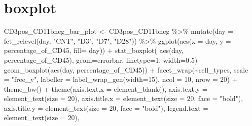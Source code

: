 \documentclass[
]{book}
\newenvironment{Shaded}{\begin{snugshade}}{\end{snugshade}}
\newcommand{\AttributeTok}[1]{\textcolor[rgb]{0.77,0.63,0.00}{#1}}
\newcommand{\DecValTok}[1]{\textcolor[rgb]{0.00,0.00,0.81}{#1}}
\newcommand{\FloatTok}[1]{\textcolor[rgb]{0.00,0.00,0.81}{#1}}
\newcommand{\FunctionTok}[1]{\textcolor[rgb]{0.00,0.00,0.00}{#1}}
\newcommand{\NormalTok}[1]{#1}
\newcommand{\OtherTok}[1]{\textcolor[rgb]{0.56,0.35,0.01}{#1}}
\newcommand{\SpecialCharTok}[1]{\textcolor[rgb]{0.00,0.00,0.00}{#1}}
\newcommand{\StringTok}[1]{\textcolor[rgb]{0.31,0.60,0.02}{#1}}
\begin{document}
\hypertarget{boxplot}{%
\section{boxplot}\label{boxplot}}

\begin{Shaded}
\begin{Highlighting}[]
\NormalTok{CD3pos\_CD11bneg\_bar\_plot }\OtherTok{\textless{}{-}}\NormalTok{ CD3pos\_CD11bneg }\SpecialCharTok{\%\textgreater{}\%}
\FunctionTok{mutate}\NormalTok{(}\AttributeTok{day =} \FunctionTok{fct\_relevel}\NormalTok{(day,}
            \StringTok{"CNT"}\NormalTok{, }\StringTok{"D3"}\NormalTok{, }\StringTok{"D7"}\NormalTok{,}
            \StringTok{"D28"}\NormalTok{)) }\SpecialCharTok{\%\textgreater{}\%}
  \FunctionTok{ggplot}\NormalTok{(}\FunctionTok{aes}\NormalTok{(}\AttributeTok{x =}\NormalTok{ day, }\AttributeTok{y =}\NormalTok{ percentage\_of\_CD45, }\AttributeTok{fill=}\NormalTok{ day)) }\SpecialCharTok{+}
  \FunctionTok{stat\_boxplot}\NormalTok{( }\FunctionTok{aes}\NormalTok{(day, percentage\_of\_CD45), }
    \AttributeTok{geom=}\StringTok{\textquotesingle{}errorbar\textquotesingle{}}\NormalTok{, }\AttributeTok{linetype=}\DecValTok{1}\NormalTok{, }\AttributeTok{width=}\FloatTok{0.5}\NormalTok{)}\SpecialCharTok{+}  
  \FunctionTok{geom\_boxplot}\NormalTok{(}\FunctionTok{aes}\NormalTok{(day, percentage\_of\_CD45)) }\SpecialCharTok{+} 
  \FunctionTok{facet\_wrap}\NormalTok{(}\SpecialCharTok{\textasciitilde{}}\NormalTok{cell\_types, }\AttributeTok{scale =} \StringTok{"free\_y"}\NormalTok{, }\AttributeTok{labeller =} \FunctionTok{label\_wrap\_gen}\NormalTok{(}\AttributeTok{width=}\DecValTok{15}\NormalTok{), }\AttributeTok{ncol =} \DecValTok{10}\NormalTok{, }\AttributeTok{nrow =} \DecValTok{20}\NormalTok{) }\SpecialCharTok{+} 
  \FunctionTok{theme\_bw}\NormalTok{() }\SpecialCharTok{+} 
  \FunctionTok{theme}\NormalTok{(}\AttributeTok{axis.text.x =} \FunctionTok{element\_blank}\NormalTok{(), }\AttributeTok{axis.text.y =} \FunctionTok{element\_text}\NormalTok{(}\AttributeTok{size =} \DecValTok{20}\NormalTok{), }
        \AttributeTok{axis.title.x =} \FunctionTok{element\_text}\NormalTok{(}\AttributeTok{size =} \DecValTok{20}\NormalTok{, }\AttributeTok{face =} \StringTok{"bold"}\NormalTok{), }
        \AttributeTok{axis.title.y =} \FunctionTok{element\_text}\NormalTok{(}\AttributeTok{size =} \DecValTok{20}\NormalTok{, }\AttributeTok{face =} \StringTok{"bold"}\NormalTok{), }
        \AttributeTok{legend.text =} \FunctionTok{element\_text}\NormalTok{(}\AttributeTok{size =} \DecValTok{20}\NormalTok{), }

\end{Highlighting}
\end{Shaded}
\end{document}
